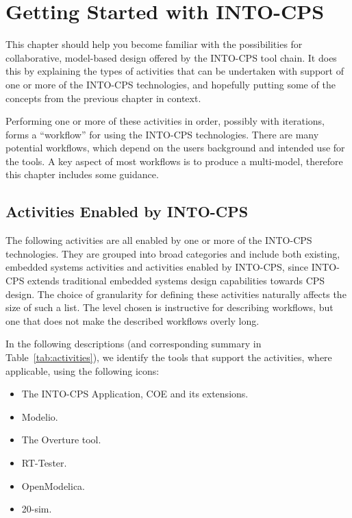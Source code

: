 \chapter{Getting Started with INTO-CPS}
\label{sec:workflows}

This chapter should help you become familiar with the possibilities for collaborative, model-based design offered by the INTO-CPS tool chain. It does this by explaining the types of activities that can be undertaken with support of one or more of the INTO-CPS technologies, and hopefully putting some of the concepts from the previous chapter in context.

Performing one or more of these activities in order, possibly with iterations, forms a ``workflow'' for using the INTO-CPS technologies. There are many potential workflows, which depend on the users background and intended use for the tools. A key aspect of most workflows is to produce a multi-model, therefore this chapter includes some guidance.

\section{Activities Enabled by INTO-CPS}


The following activities are all enabled by one or more of the INTO-CPS technologies. They are grouped into broad categories and include both existing, embedded systems activities and activities enabled by INTO-CPS, since INTO-CPS extends traditional embedded systems design capabilities towards CPS design. The choice of granularity for defining these activities naturally affects the size of such a list. The level chosen is instructive for describing workflows, but one that does not make the described workflows overly long.  %

In the following descriptions (and corresponding summary in Table~\ref{tab:activities}), we identify the tools that support the activities, where applicable, using the following icons:

\begin{itemize}[noitemsep]
\item[\INTOCPS] The INTO-CPS Application, COE and its extensions.
\item[\Modelio] Modelio.
\item[\Overture] The Overture tool.
\item[\RTTester] RT-Tester.
\item[\OpenModelica] OpenModelica.
\item[\TwentySim] 20-sim.
\end{itemize}

